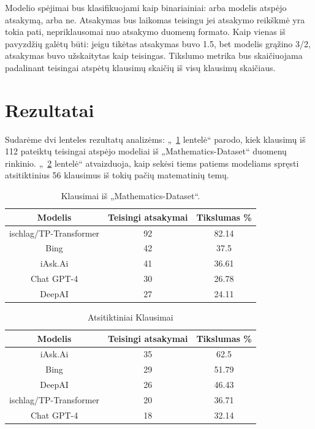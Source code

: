 \documentclass[conference]{IEEEtran}
\begin{document}
Modelio spėjimai bus klasifikuojami kaip binariainiai: arba modelis atspėjo atsakymą, arba ne.
Atsakymas bus laikomas teisingu jei atsakymo reikškmė yra tokia pati, nepriklausomai nuo atsakymo duomenų formato.
Kaip vienas iš pavyzdžių galėtų būti: jeigu tikėtas atsakymas buvo 1.5, bet modelis grąžino
3/2, atsakymas buvo užskaitytas kaip teisingas.
Tikslumo metrika bus skaičiuojama padalinant teisingai atspėtų klausimų skaičių iš visų klausimų skaičiaus.

\section{Rezultatai}
Sudarėme dvi lenteles rezultatų analizėms: „~\ref{lentele:1} lentelė“ parodo, kiek klausimų iš 112 pateiktų
teisingai atspėjo modeliai iš „Mathematics-Dataset“ duomenų rinkinio. „~\ref{lentele:2} lentelė“  atvaizduoja,
kaip sekėsi tiems patiems modeliams spręsti atsitiktinius 56 klausimus iš tokių pačių matematinių temų.

\begin{table}[h!]
    \centering
    \caption{Klausimai iš „Mathematics-Dataset“.}
    \label{lentele:1}
    \begin{tabular}{|c c c|} 
     \hline
     Modelis & Teisingi atsakymai & Tikslumas \% \\ [0.5ex] 
     \hline\hline
     ischlag/TP-Transformer & 92 & 82.14 \\ 
     \hline
     Bing & 42 & 37.5 \\
     \hline
     iAsk.Ai & 41 & 36.61 \\
     \hline
     Chat GPT-4 & 30 & 26.78 \\
     \hline
     DeepAI & 27 & 24.11 \\
     \hline
    \end{tabular}
    \end{table}

\begin{table}[h!]
        \centering
        \caption{Atsitiktiniai Klausimai}
        \label{lentele:2}
        \begin{tabular}{|c c c|} 
        \hline
        Modelis & Teisingi atsakymai & Tikslumas \% \\ [0.5ex] 
        \hline\hline
        iAsk.Ai & 35 & 62.5 \\
        \hline
        Bing & 29 & 51.79 \\
        \hline
        DeepAI & 26 & 46.43 \\
        \hline
        ischlag/TP-Transformer & 20 & 36.71 \\
        \hline
        Chat GPT-4 & 18 & 32.14 \\
        \hline
    \end{tabular}
    \end{table}
\end{document}
